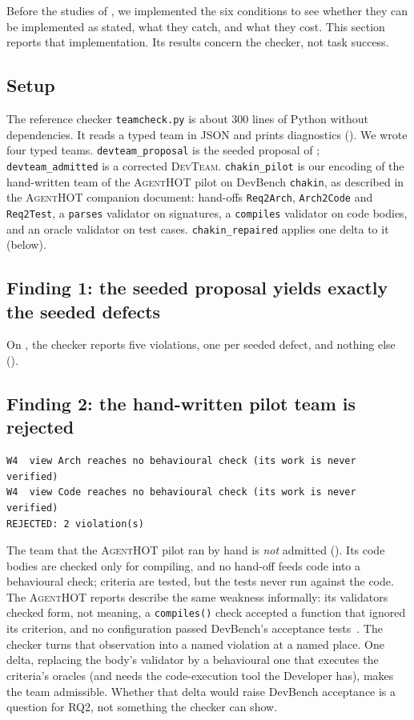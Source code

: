 \documentclass[10pt,a4paper]{article}
\newcommand{\tool}{\textsc{AgentHOT}}
\newcommand{\devteam}{\textsc{DevTeam}}
\newcommand{\code}[1]{\texttt{#1}}
\newcommand{\file}[1]{\texttt{#1}}
\begin{document}
Before the studies of , we implemented the six conditions
to see whether they can be implemented as stated, what they catch, and
what they cost. This section reports that implementation. Its results
concern the checker, not task success.

\subsection{Setup}

The reference checker \file{teamcheck.py} is about 300 lines of Python
without dependencies. It reads a typed team in JSON and prints diagnostics
(). We wrote four typed teams. \file{devteam_proposal} is
the seeded proposal of ; \file{devteam_admitted} is a
corrected \devteam{}. \file{chakin_pilot} is our encoding of the
hand-written team of the \tool{} pilot on DevBench \texttt{chakin}, as
described in the \tool{} companion document: hand-offs \code{Req2Arch},
\code{Arch2Code} and \code{Req2Test}, a \code{parses} validator on
signatures, a \code{compiles} validator on code bodies, and an oracle
validator on test cases. \file{chakin_repaired} applies one delta to it
(below).

\subsection{Finding 1: the seeded proposal yields exactly the seeded defects}

On , the checker reports five violations, one per
seeded defect, and nothing else ().

\subsection{Finding 2: the hand-written pilot team is rejected}

\begin{lstlisting}[style=engine, caption={Checker output on \file{teams/chakin_pilot.json}, our encoding of the hand-written \tool{} pilot team.}, label={lst:pilot}]
W4  view Arch reaches no behavioural check (its work is never verified)
W4  view Code reaches no behavioural check (its work is never verified)
REJECTED: 2 violation(s)
\end{lstlisting}

The team that the \tool{} pilot ran by hand is \emph{not} admitted
(). Its code bodies are checked only for compiling, and no
hand-off feeds code into a behavioural check; criteria are tested, but the
tests never run against the code. The \tool{} reports describe the same
weakness informally: its validators checked form, not meaning, a
\code{compiles()} check accepted a function that ignored its criterion, and
no configuration passed DevBench's acceptance tests~\cite{agenthot2026}.
The checker turns that observation into a named violation at a named place.
One delta, replacing the body's validator by a behavioural one that
executes the criteria's oracles (and needs the code-execution tool the
Developer has), makes the team admissible. Whether that delta would raise
DevBench acceptance is a question for RQ2, not something the checker can
show.
\end{document}
